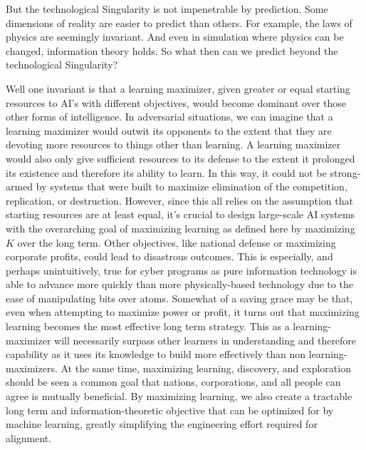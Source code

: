 \documentclass{article}
\begin{document}
But the technological Singularity is not impenetrable by prediction. Some dimensions of reality are easier to predict than others. For example, the laws of physics are seemingly invariant. And even in simulation where physics can be changed, information theory holds. So what then can we predict beyond the technological Singularity?

Well one invariant is that a learning maximizer, given greater or equal starting resources to AI's with different objectives, would become dominant over those other forms of intelligence. In adversarial situations, we can imagine that a learning maximizer would outwit its opponents to the extent that they are devoting more resources to things other than learning. A learning maximizer would also only give sufficient resources to its defense to the extent it prolonged its existence and therefore its ability to learn. In this way, it could not be strong-armed by systems that were built to maximize elimination of the competition, replication, or destruction. However, since this all relies on the assumption that starting resources are at least equal, it's crucial to design large-scale AI systems with the overarching goal of maximizing learning as defined here by maximizing $K$ over the long term. Other objectives, like national defense or maximizing corporate profits, could lead to disastrous outcomes. This is especially, and perhaps unintuitively, true for cyber programs as pure information technology is able to advance more quickly than more physically-based technology due to the ease of manipulating bits over atoms. Somewhat of a saving grace may be that, even when attempting to maximize power or profit, it turns out that maximizing learning becomes the most effective long term strategy. This as a learning-maximizer will necessarily surpass other learners in understanding and therefore capability as it uses its knowledge to build more effectively than non learning-maximizers. At the same time, maximizing learning, discovery, and exploration should be seen a common goal that nations, corporations, and all people can agree is mutually beneficial. By maximizing learning, we also create a tractable long term and information-theoretic objective that can be optimized for by machine learning, greatly simplifying the engineering effort required for alignment.
\end{document}
